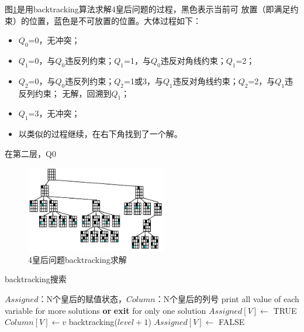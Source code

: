 \documentclass[10pt,letterpaper]{ctexart}
\newcommand{\figref}[1]{图\ref{#1}}
\begin{document}
\begin{enumerate}[itemindent=2em,label=\arabic*、]
    \par \qquad \figref{fig:4-queens}是用backtracking算法求解4皇后问题的过程，黑色表示当前可
    放置（即满足约束）的位置，蓝色是不可放置的位置。大体过程如下：
    \begin{itemize}[itemindent=2em]
      \item $Q_0$=0，无冲突；
      \item $Q_1$=0，与$Q_0$违反列约束；$Q_1$=1，与$Q_0$违反对角线约束；$Q_1$=2；
      \item $Q_2$=0，与$Q_0$违反列约束；$Q_2$=1或3，与$Q_1$违反对角线约束；$Q_2$=2，与$Q_1$违反列约束；
      无解，回溯到$Q_1$；
      \item $Q_1$=3，无冲突；
      \item 以类似的过程继续，在右下角找到了一个解。
    \end{itemize}
    在第二层，Q0
    \begin{figure}[H]
      \centering
      \includegraphics[width=0.55\textwidth]{4-queen.PNG}
      \caption{4皇后问题backtracking求解}
      \label{fig:4-queens}
    \end{figure}

    \begin{algorithm}
      \caption{backtracking搜索}
        \begin{algorithmic}[1] %
          \Require $Assigned$：N个皇后的赋值状态，$Column$：N个皇后的列号
                \State print all value of each variable
                \State \Return for more solutions \textbf{or} 
                \textbf{exit} for only one solution
              \Else
                \State $Assigned[V] \gets$ TRUE
                  \State $Column[V] \gets v$
                    \State backtracking($level + 1$)
                  \EndIf
                \EndFor
                \State $Assigned[V] \gets$ FALSE
                \State \Return
              \EndIf
            \EndFunction
        \end{algorithmic}
    \end{algorithm}
    

\end{enumerate}
\end{document}
